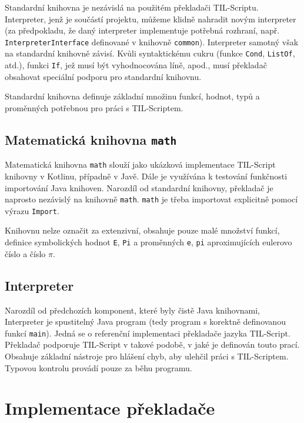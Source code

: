 Standardní knihovna je nezávislá na použitém překladači TIL-Scriptu. Interpreter, jenž je součástí
projektu, můžeme klidně nahradit novým interpreter (za předpokladu, že daný interpreter implementuje
potřebná rozhraní, např. \lstinline{InterpreterInterface} definované v knihovně \lstinline{common}).
Interpreter samotný však na standardní knihovně závisí. Kvůli syntaktickému cukru
(funkce \lstinline{Cond}, \lstinline{ListOf}, atd.), funkci \lstinline{If}, jež musí být
vyhodnocována líně, apod., musí překladač obsahovat speciální podporu pro standardní knihovnu.

Standardní knihovna definuje základní množinu funkcí, hodnot, typů a proměnných potřebnou pro práci
s TIL-Scriptem.

\subsection{Matematická knihovna \lstinline{math}}

Matematická knihovna \lstinline{math} slouží jako ukázková implementace TIL-Script knihovny
v Kotlinu, případně v Javě. Dále je využívána k testování funkčnosti importování Java knihoven.
Narozdíl od standardní knihovny, překladač je naprosto nezávislý na knihovně \lstinline{math}.
\lstinline{math} je třeba importovat explicitně pomocí výrazu \lstinline{Import}.

Knihovnu nelze označit za extenzivní, obsahuje pouze malé množství funkcí, definice symbolických
hodnot \lstinline{E}, \lstinline{Pi} a proměnných \lstinline{e}, \lstinline{pi} aproximujících
eulerovo číslo a číslo $\pi$.

\subsection{Interpreter}

Narozdíl od předchozích komponent, které byly čistě Java knihovnami, Interpreter je spustitelný Java
program (tedy program s korektně definovanou funkcí \lstinline{main}). Jedná se o referenční
implementaci překladače jazyka TIL-Script. Překladač podporuje TIL-Script v takové podobě, v jaké je
definován touto prací. Obsahuje základní nástroje pro hlášení chyb, aby ulehčil práci
s TIL-Scriptem. Typovou kontrolu provádí pouze za běhu programu.

\section{Implementace překladače}

